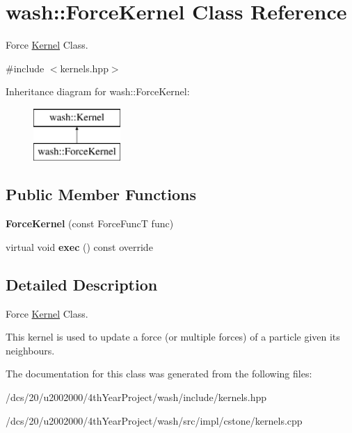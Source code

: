 \hypertarget{classwash_1_1ForceKernel}{}\section{wash\+:\+:Force\+Kernel Class Reference}
\label{classwash_1_1ForceKernel}


Force \mbox{\hyperlink{classwash_1_1Kernel}{Kernel}} Class.  




{\ttfamily \#include $<$kernels.\+hpp$>$}

Inheritance diagram for wash\+:\+:Force\+Kernel\+:\begin{figure}[H]
\begin{center}
\leavevmode
\includegraphics[height=2.000000cm]{classwash_1_1ForceKernel}
\end{center}
\end{figure}
\subsection*{Public Member Functions}
\begin{DoxyCompactItemize}
\item 
\mbox{\label{classwash_1_1ForceKernel_a5dd87d8036d74c210c51fb6aa97a3de8}} 
{\bfseries Force\+Kernel} (const Force\+FuncT func)
\item 
\mbox{\label{classwash_1_1ForceKernel_aa815514d4e9af5ebb056dbe8f1d5a720}} 
virtual void {\bfseries exec} () const override
\end{DoxyCompactItemize}


\subsection{Detailed Description}
Force \mbox{\hyperlink{classwash_1_1Kernel}{Kernel}} Class. 

This kernel is used to update a force (or multiple forces) of a particle given its neighbours. 

The documentation for this class was generated from the following files\+:\begin{DoxyCompactItemize}
\item 
/dcs/20/u2002000/4th\+Year\+Project/wash/include/kernels.\+hpp\item 
/dcs/20/u2002000/4th\+Year\+Project/wash/src/impl/cstone/kernels.\+cpp\end{DoxyCompactItemize}
